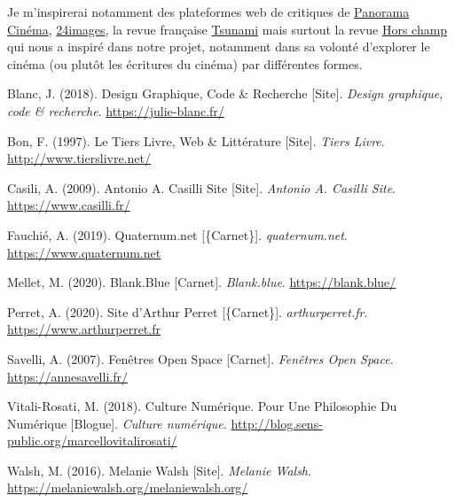 \documentclass[12pt,french,letterpaper]{article}
\begin{document}
{Je m'inspirerai notamment des plateformes web de critiques de
\href{https://www.panorama-cinema.com/V2/index.php}{Panorama Cinéma},
\href{https://revue24images.com}{24images}, la revue française
\href{https://tsounami.fr}{Tsunami} mais surtout la revue
\href{https://horschamp.qc.ca}{Hors champ} qui nous a inspiré dans notre
projet, notamment dans sa volonté d'explorer le cinéma (ou plutôt les
écritures du cinéma) par différentes formes.

\hypertarget{refs}{}
\begin{CSLReferences}{1}{0}
\leavevmode{}%
Blanc, J. (2018). Design Graphique, Code \& Recherche {[}Site{]}.
\emph{Design graphique, code \& recherche}.
\url{https://julie-blanc.fr/}

\leavevmode{}%
Bon, F. (1997). Le {Tiers} Livre, Web \& Littérature {[}Site{]}.
\emph{Tiers Livre}. \url{http://www.tierslivre.net/}

\leavevmode{}%
Casili, A. (2009). Antonio {A}. {Casilli Site} {[}Site{]}. \emph{Antonio
A. Casilli Site}. \url{https://www.casilli.fr/}

\leavevmode{}%
Fauchié, A. (2019). {Quaternum.net} {[}\{Carnet\}{]}.
\emph{quaternum.net}. \url{https://www.quaternum.net}

\leavevmode{}%
Mellet, M. (2020). Blank.Blue {[}Carnet{]}. \emph{Blank.blue}.
\url{https://blank.blue/}

\leavevmode{}%
Perret, A. (2020). {Site d'Arthur Perret} {[}\{Carnet\}{]}.
\emph{arthurperret.fr}. \url{https://www.arthurperret.fr}

\leavevmode{}%
Savelli, A. (2007). Fenêtres {Open Space} {[}Carnet{]}. \emph{Fenêtres
Open Space}. \url{https://annesavelli.fr/}

\leavevmode{}%
Vitali-Rosati, M. (2018). Culture Numérique. {Pour} Une Philosophie Du
Numérique {[}Blogue{]}. \emph{Culture numérique.}
\url{http://blog.sens-public.org/marcellovitalirosati/}

\leavevmode{}%
Walsh, M. (2016). Melanie {Walsh} {[}Site{]}. \emph{Melanie Walsh}.
\url{https://melaniewalsh.org/melaniewalsh.org/}

\end{CSLReferences}}
\end{document}
